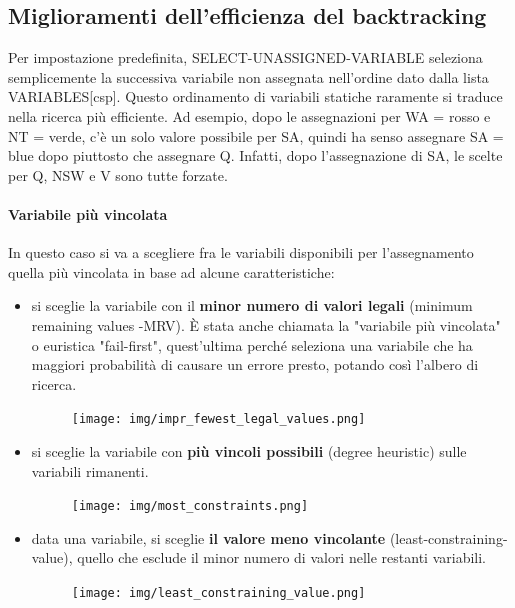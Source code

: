 \subsection{Miglioramenti dell'efficienza del backtracking}
Per impostazione predefinita, SELECT-UNASSIGNED-VARIABLE seleziona semplicemente la successiva variabile non assegnata nell'ordine dato dalla lista VARIABLES[csp]. Questo ordinamento di variabili statiche raramente si traduce nella ricerca più efficiente. Ad esempio, dopo le assegnazioni per WA = rosso e NT = verde, c'è un solo valore possibile per SA, quindi ha senso assegnare SA = blue dopo piuttosto che assegnare Q. Infatti, dopo l'assegnazione di SA, le scelte per Q, NSW e V sono tutte forzate.
\paragraph{Variabile più vincolata} In questo caso si va a scegliere fra le variabili disponibili per l'assegnamento quella più vincolata in base ad alcune caratteristiche:
\begin{itemize}
    \item si sceglie la variabile con il \textbf{minor numero di valori legali} (minimum remaining values -MRV). È stata anche chiamata la "variabile più vincolata" o euristica "fail-first", quest'ultima perché seleziona una variabile che ha maggiori probabilità di causare un errore presto, potando così l'albero di ricerca.
    \begin{figure}[H]
    	\centering
        \texttt{[image: img/impr\_fewest\_legal\_values.png]}
        \label{fig:fewest_legal_values}
    \end{figure}
    \item si sceglie la variabile con \textbf{più vincoli possibili} (degree heuristic) sulle variabili rimanenti.
    \begin{figure}[H]
    	\centering
        \texttt{[image: img/most\_constraints.png]}
        \label{fig:most_costraint}
    \end{figure}
    \item data una variabile, si sceglie \textbf{il valore meno vincolante} (least-constraining-value), quello che esclude il minor numero di valori nelle restanti variabili.
    \begin{figure}[H]
    	\centering
        \texttt{[image: img/least\_constraining\_value.png]}
        \label{fig:least_constraining_value}
    \end{figure}
\end{itemize}

